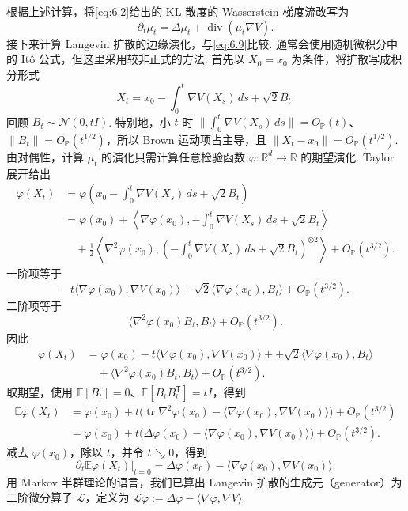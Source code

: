 根据上述计算，将\eqref{eq:6.2}给出的 KL 散度的 Wasserstein 梯度流改写为
\begin{equation}\label{eq:6.9}
\partial_t\mu_t=\Delta\mu_t+\operatorname{div}(\mu_t\nabla V).
\end{equation}
接下来计算 Langevin 扩散的边缘演化，与\eqref{eq:6.9}比较. 通常会使用随机微积分中的 Itô 公式，但这里采用较非正式的方法. 首先以 $X_0=x_0$ 为条件，将扩散写成积分形式
$$
X_t=x_0-\int_0^t\nabla V(X_s)\,ds+\sqrt2B_t.
$$
回顾 $B_t\sim\mathcal N(0,tI)$. 特别地，小 $t$ 时 $\|\int_0^t\nabla V(X_s)\,ds\|=O_{\mathbb P}(t)$、$\|B_t\|=O_{\mathbb P}(t^{1/2})$，所以 Brown 运动项占主导，且 $\|X_t-x_0\|=O_{\mathbb P}(t^{1/2})$. 由对偶性，计算 $\mu_t$ 的演化只需计算任意检验函数 $\varphi:\mathbb R^d\to\mathbb R$ 的期望演化. Taylor 展开给出
$$
\begin{aligned}
\varphi(X_t)
&=\varphi\left(x_0-\int_0^t\nabla V(X_s)\,ds+\sqrt2B_t\right)\\
&=\varphi(x_0)+\left\langle\nabla\varphi(x_0),-\int_0^t\nabla V(X_s)\,ds+\sqrt2B_t\right\rangle\\
&\quad+\frac12\left\langle\nabla^2\varphi(x_0),
\left(-\int_0^t\nabla V(X_s)\,ds+\sqrt2B_t\right)^{\otimes2}\right\rangle
+O_{\mathbb P}(t^{3/2}).
\end{aligned}
$$
一阶项等于
$$
-t\langle\nabla\varphi(x_0),\nabla V(x_0)\rangle
+\sqrt2\langle\nabla\varphi(x_0),B_t\rangle+O_{\mathbb P}(t^{3/2}).
$$
二阶项等于
$$
\langle\nabla^2\varphi(x_0)B_t,B_t\rangle+O_{\mathbb P}(t^{3/2}).
$$
因此
$$
\begin{aligned}
\varphi(X_t)
&=\varphi(x_0)-t\langle\nabla\varphi(x_0),\nabla V(x_0)\rangle
++\sqrt2\langle\nabla\varphi(x_0),B_t\rangle\\
&\quad+\langle\nabla^2\varphi(x_0)B_t,B_t\rangle+O_{\mathbb P}(t^{3/2}).
\end{aligned}
$$
取期望，使用 $\mathbb E[B_t]=0$、$\mathbb E[B_tB_t^{\mathsf T}]=tI$，得到
$$
\begin{aligned}
\mathbb E\varphi(X_t)
&=\varphi(x_0)+t\bigl(\operatorname{tr}\nabla^2\varphi(x_0)
-\langle\nabla\varphi(x_0),\nabla V(x_0)\rangle\bigr)+O_{\mathbb P}(t^{3/2})\\
&=\varphi(x_0)+t\bigl(\Delta\varphi(x_0)
-\langle\nabla\varphi(x_0),\nabla V(x_0)\rangle\bigr)+O_{\mathbb P}(t^{3/2}).
\end{aligned}
$$
减去 $\varphi(x_0)$，除以 $t$，并令 $t\searrow0$，得到
\begin{equation}\label{eq:6.10}
\left.\partial_t\mathbb E\varphi(X_t)\right|_{t=0}
=\Delta\varphi(x_0)-\langle\nabla\varphi(x_0),\nabla V(x_0)\rangle.
\end{equation}
用 Markov 半群理论的语言，我们已算出 Langevin 扩散的生成元（generator）为二阶微分算子 $\mathcal L$，定义为 $\mathcal L\varphi:=\Delta\varphi-\langle\nabla\varphi,\nabla V\rangle$.

